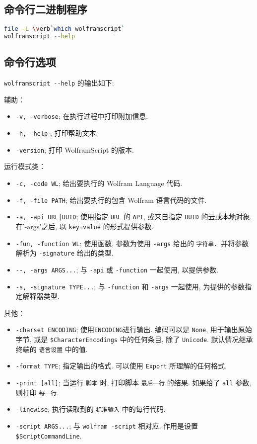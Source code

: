 
\begin{issues}
\issueDraft
\issueTODO
\end{issues}

\subsection{命令行二进制程序}

\begin{lstlisting}[language=bash]
file -L \verb`which wolframscript`
wolframscript --help
\end{lstlisting}

\subsection{命令行选项} 

\verb`wolframscript --help` 的输出如下:

辅助：
\begin{itemize}
\item \verb`-v, -verbose`; 在执行过程中打印附加信息.
\item \verb`-h, -help` ; 打印帮助文本.
\item \verb`-version`; 打印 WolframScript 的版本.
\end{itemize}
运行模式类：
\begin{itemize}
\item \verb`-c, -code WL`; 给出要执行的 Wolfram Language 代码.
\item \verb`-f, -file PATH`; 给出要执行的包含 Wolfram 语言代码的文件.
\item \verb`-a, -api URL|UUID`; 使用指定 \verb`URL` 的 \verb`API`, 或来自指定 \verb`UUID` 的云或本地对象. 在'-args'之后, 以 \verb`key=value` 的形式提供参数.
\item \verb`-fun, -function WL`; 使用函数, 参数为使用 \verb`-args` 给出的 \verb`字符串`．并将参数解析为 \verb`-signature` 给出的类型.
\item \verb`--, -args ARGS...`; 与 \verb`-api` 或 \verb`-function` 一起使用, 以提供参数.
\item \verb`-s, -signature TYPE...`; 与 \verb`-function` 和 \verb`-args` 一起使用, 为提供的参数指定解释器类型.
\end{itemize}
其他：
\begin{itemize}
\item \verb`-charset ENCODING`; 使用\verb`ENCODING`进行输出. 编码可以是 \verb`None`, 用于输出原始字节,
或是 \verb`$CharacterEncodings` 中的任何条目, 除了 \verb`Unicode`. 默认情况继承终端的 \verb`语言设置` 中的值.
\item \verb`-format TYPE`; 指定输出的格式. 可以使用 \verb`Export` 所理解的任何格式.
\item \verb`-print [all]`; 当运行 \verb`脚本` 时, 打印脚本 \verb`最后一行` 的结果. 如果给了 \verb`all` 参数, 则打印 \verb`每一行`.
\item \verb`-linewise`; 执行读取到的 \verb`标准输入` 中的每行代码.
\item \verb`-script ARGS...`; 与 \verb`wolfram -script` 相对应, 作用是设置 \verb`$ScriptCommandLine`.
\end{itemize}

